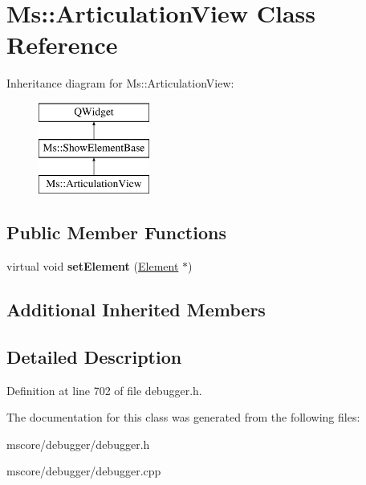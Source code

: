 \hypertarget{class_ms_1_1_articulation_view}{}\section{Ms\+:\+:Articulation\+View Class Reference}
\label{class_ms_1_1_articulation_view}
Inheritance diagram for Ms\+:\+:Articulation\+View\+:\begin{figure}[H]
\begin{center}
\leavevmode
\includegraphics[height=3.000000cm]{class_ms_1_1_articulation_view}
\end{center}
\end{figure}
\subsection*{Public Member Functions}
\begin{DoxyCompactItemize}
\item 
\mbox{\label{class_ms_1_1_articulation_view_a7418b5c1eebb2034cfe3aa5899352c72}} 
virtual void {\bfseries set\+Element} (\hyperlink{class_ms_1_1_element}{Element} $\ast$)
\end{DoxyCompactItemize}
\subsection*{Additional Inherited Members}


\subsection{Detailed Description}


Definition at line 702 of file debugger.\+h.



The documentation for this class was generated from the following files\+:\begin{DoxyCompactItemize}
\item 
mscore/debugger/debugger.\+h\item 
mscore/debugger/debugger.\+cpp\end{DoxyCompactItemize}
